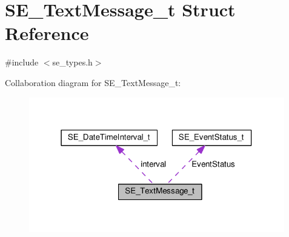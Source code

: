 \hypertarget{structSE__TextMessage__t}{}\section{S\+E\+\_\+\+Text\+Message\+\_\+t Struct Reference}
\label{structSE__TextMessage__t}


{\ttfamily \#include $<$se\+\_\+types.\+h$>$}



Collaboration diagram for S\+E\+\_\+\+Text\+Message\+\_\+t\+:\nopagebreak
\begin{figure}[H]
\begin{center}
\leavevmode
\includegraphics[width=316pt]{structSE__TextMessage__t__coll__graph}
\end{center}
\end{figure}
